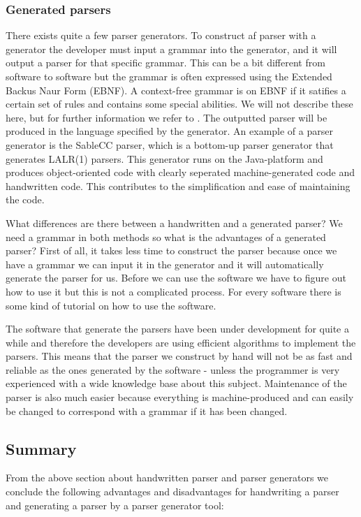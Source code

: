 \subsubsection{Generated parsers}
\label{subsec:generatedparsers}
There exists quite a few parser generators. To construct af parser with a generator 
the developer must input a grammar into the generator, and it will output a parser 
for that specific grammar. This can be a bit different from software to software but the grammar is often expressed
using the Extended Backus Naur Form (EBNF). A context-free grammar is on EBNF if it
satifies a certain set of rules and contains some special abilities. We will not describe
these here, but for further information we refer to \cite[152]{fischer2009}. The outputted parser will be
produced in the language specified by the generator. An example of a parser generator is the SableCC parser, 
which is a bottom-up parser generator that generates LALR(1) parsers. This
generator runs on the Java-platform and produces object-oriented code with
clearly seperated machine-generated code and handwritten code. This contributes
to the simplification and ease of maintaining the code.\cite[pp. 11]{sableccdoc}

What differences are there between a handwritten and a generated parser? We need
a grammar in both methods so what is the advantages of a generated parser? First
of all, it takes less time to construct the parser because once we have a
grammar we can input it in the generator and it will automatically generate the
parser for us. Before we can use the software we have to figure out how to use
it but this is not a complicated process. For every software there is some kind
of tutorial on how to use the software.

The software that generate the parsers have been under development for quite a
while and therefore the developers are using efficient algorithms to implement
the parsers. This means that the parser we construct by hand will not be as fast
and reliable as the ones generated by the software - unless the programmer is
very experienced with a wide knowledge base about this subject. Maintenance of the 
parser is also much easier because everything is machine-produced and can easily be 
changed to correspond with a grammar if it has been changed.

\subsection{Summary}
\label{subsec:summary-parser}
From the above section about handwritten parser and parser generators we conclude the
following advantages and disadvantages for handwriting a parser and generating a parser by a parser
generator tool:

